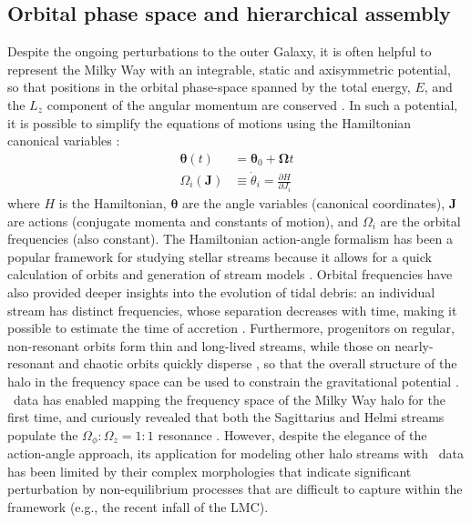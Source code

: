\documentclass[final,5p,times,twocolumn,authoryear]{elsarticle}
\begin{document}
\subsection{Orbital phase space and hierarchical assembly}
\label{sec:phasespace}
Despite the ongoing perturbations to the outer Galaxy, it is often helpful to represent the Milky Way with an integrable, static and axisymmetric potential, so that positions in the orbital phase-space spanned by the total energy, $E$, and the $L_z$ component of the angular momentum are conserved \citep{noether:1918}.
In such a potential, it is possible to simplify the equations of motions using the Hamiltonian canonical variables \citep{goldstein:2002, helmi:1999, tremaine:1999, eyre:2011}:
\begin{align}
\pmb{\theta}(t) &= \pmb{\theta}_0 + \pmb{\Omega} t
\label{eq:angle}
\\
\Omega_i(\pmb{J}) &\equiv \dot{\theta}_i = \frac{\partial H}{\partial J_i}
\label{eq:frequency}
\end{align}
where $H$ is the Hamiltonian, $\pmb{\theta}$ are the angle variables (canonical coordinates), $\pmb{J}$ are actions (conjugate momenta and constants of motion), and $\Omega_i$ are the orbital frequencies (also constant).
The Hamiltonian action-angle formalism has been a popular framework for studying stellar streams because it allows for a quick calculation of orbits and generation of stream models \citep[e.g.,][]{eyre:2011,sanders:2013a,bovy:2014, vasiliev:2019}.
Orbital frequencies have also provided deeper insights into the evolution of tidal debris: an individual stream has distinct frequencies, whose separation decreases with time, making it possible to estimate the time of accretion \citep{gomez:2010}.
Furthermore, progenitors on regular, non-resonant orbits form thin and long-lived streams, while those on nearly-resonant and chaotic orbits quickly disperse \citep{price-whelan:2016a, price-whelan:2016b, yavetz:2023}, so that the overall structure of the halo in the frequency space can be used to constrain the gravitational potential \citep{valluri:2012, yavetz:2021}.
\gaia\ data has enabled mapping the frequency space of the Milky Way halo for the first time, and curiously revealed that both the Sagittarius and Helmi streams populate the $\Omega_\phi:\Omega_z=1:1$ resonance \citep{koppelman:2021a, dodd:2022}.
However, despite the elegance of the action-angle approach, its application for modeling other halo streams with \gaia\ data has been limited by their complex morphologies that indicate significant perturbation by non-equilibrium processes that are difficult to capture within the framework (e.g., the recent infall of the LMC).
\end{document}

